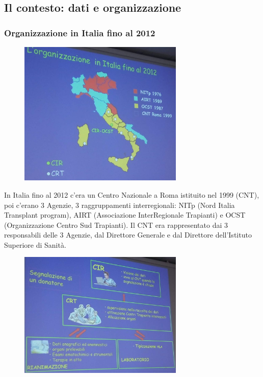 \subsection{Il contesto: dati e organizzazione}


\subsubsection{Organizzazione in Italia fino al 2012}

\begin{figure}[!ht]
\centering
	\includegraphics[width=0.7\textwidth]{34/image3.jpeg}
	\end{figure}

In Italia fino al 2012 c'era un Centro Nazionale a Roma istituito nel
1999 (CNT), poi c'erano 3 Agenzie, 3 raggruppamenti interregionali: NITp
(Nord Italia Transplant program), AIRT (Associazione InterRegionale
Trapianti) e OCST (Organizzazione Centro Sud Trapianti). Il CNT era
rappresentato dai 3 responsabili delle 3 Agenzie, dal Direttore Generale
e dal Direttore dell'Istituto Superiore di Sanità.

\begin{figure}[!ht]
\centering
	\includegraphics[width=0.7\textwidth]{34/image4.jpeg}
	\end{figure}

